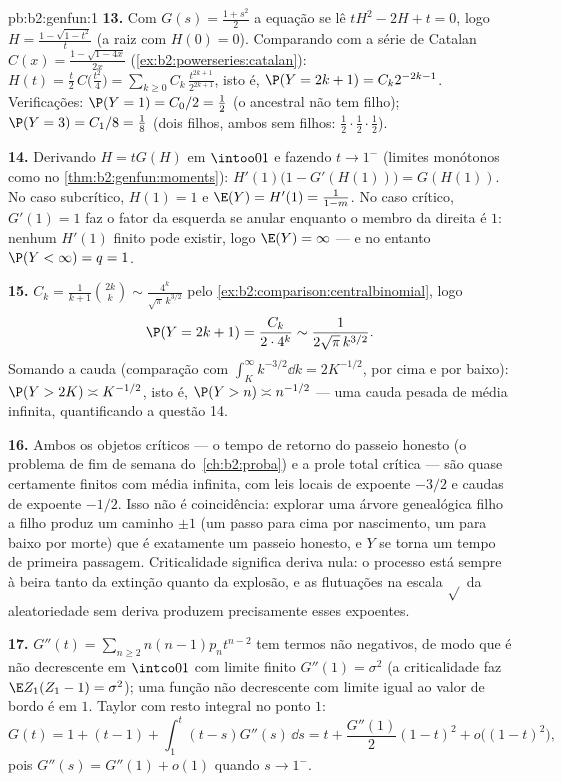 \begin{solution}{pb:b2:genfun:1}
\textbf{13.} Com $G(s) = \frac{1 + s^2}2$ a equação se lê
$tH^2 - 2H + t = 0$, logo $H = \frac{1 - \sqrt{1 - t^2}}{t}$
(a raiz com $H(0) = 0$). Comparando com a série de Catalan
$C(x) = \frac{1 - \sqrt{1 - 4x}}{2x}$
(\cref{ex:b2:powerseries:catalan}): $H(t) = \frac
t2\,C\bigl(\frac{t^2}4\bigr) =
\sum_{k\geq0}C_k\,\frac{t^{2k+1}}{2^{2k+1}}$, isto é, $\P(Y =
2k+1) = C_k2^{-2k-1}$. Verificações: $\P(Y = 1) = C_0/2 = \frac12$
(o ancestral não tem filho); $\P(Y = 3) = C_1/8 = \frac18$
(dois filhos, ambos sem filhos: $\frac12\cdot\frac12\cdot
\frac12$).

\textbf{14.} Derivando $H = tG(H)$ em $\intoo01$ e
fazendo $t \to 1^-$ (limites monótonos como no
\cref{thm:b2:genfun:moments}): $H'(1)\bigl(1 - G'(H(1))\bigr)
= G(H(1))$. No caso subcrítico, $H(1) = 1$ e $\E(Y) =
H'(1) = \frac1{1 - m}$. No caso crítico, $G'(1) = 1$
faz o fator da esquerda se anular enquanto o membro da direita é $1$: nenhum
$H'(1)$ finito pode existir, logo $\E(Y) = \infty$ --- e no entanto $\P(Y <
\infty) = q = 1$.

\textbf{15.} $C_k = \frac1{k+1}\binom{2k}k \sim
\frac{4^k}{\sqrt\pi\,k^{3/2}}$ pelo
\cref{ex:b2:comparison:centralbinomial}, logo
\[
\P(Y = 2k+1) = \frac{C_k}{2\cdot4^{k}} \sim
\frac1{2\sqrt\pi\,k^{3/2}} .
\]
Somando a cauda (comparação com $\int_K^\infty
k^{-3/2}\dd k = 2K^{-1/2}$, por cima e por baixo): $\P(Y > 2K)
\asymp K^{-1/2}$, isto é, $\P(Y > n) \asymp n^{-1/2}$ --- uma
cauda pesada de média infinita, quantificando a questão 14.

\textbf{16.} Ambos os objetos críticos --- o tempo de retorno do passeio
honesto (o problema de fim de semana do~\cref{ch:b2:proba}) e a
prole total crítica --- são quase certamente finitos com
média infinita, com leis locais de expoente $-3/2$ e caudas
de expoente $-1/2$. Isso não é coincidência: explorar uma
árvore genealógica filho a filho produz um caminho $\pm1$ (um passo
para cima por nascimento, um para baixo por morte) que é exatamente um passeio
honesto, e $Y$ se torna um tempo de primeira passagem. Criticalidade significa
deriva nula: o processo está sempre à beira tanto da
extinção quanto da explosão, e as flutuações na escala $\sqrt{}$
da aleatoriedade sem deriva produzem precisamente esses
expoentes.

\textbf{17.} $G''(t) = \sum_{n\geq2}n(n-1)p_nt^{n-2}$ tem
termos não negativos, de modo que é não decrescente em $\intco01$ com
limite finito $G''(1) = \sigma^2$ (a criticalidade faz
$\E Z_1(Z_1 - 1) = \sigma^2$); uma função não decrescente com
limite igual ao valor de bordo é  em $1$.
Taylor com resto integral no ponto $1$:
\[
G(t) = 1 + (t - 1) + \int_1^t(t - s)G''(s)\,\dd s
= t + \frac{G''(1)}2(1-t)^2 + o\bigl((1-t)^2\bigr),
\]
pois $G''(s) = G''(1) + o(1)$ quando $s \to 1^-$.


\end{solution}

